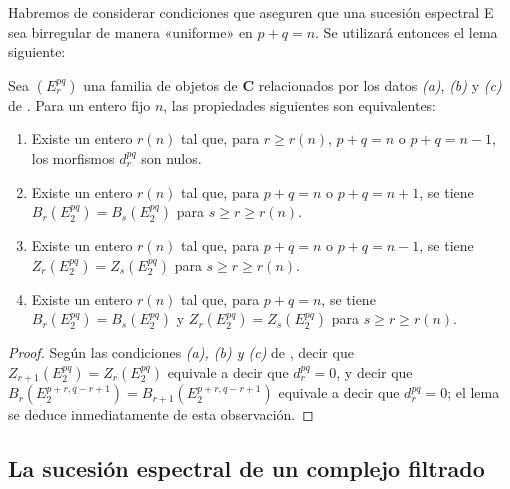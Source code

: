 \begin{env}[11.1.9]
\label{0.11.1.9-fr}
Habremos de considerar condiciones que aseguren que una sucesión espectral E sea birregular de manera «uniforme» en $p+q=n$.
Se utilizará entonces el lema siguiente:
\end{env}

\begin{lemma}[11.1.10]
\label{0.11.1.10}
\label{0.11.1.10-fr}
Sea $(E_r^{pq})$ una familia de objetos de $\mathbf{C}$ relacionados por los datos \emph{(a)}, \emph{(b)} y \emph{(c)} de .
Para un entero fijo $n$, las propiedades siguientes son equivalentes:
\begin{enumerate}
  \item[{\rm(a)}] Existe un entero $r(n)$ tal que, para $r\geq r(n)$, $p+q=n$ o $p+q=n-1$, los morfismos $d_r^{pq}$ son nulos.
  \item[{\rm(b)}] Existe un entero $r(n)$ tal que, para $p+q=n$ o $p+q=n+1$, se tiene $B_r(E_2^{pq})=B_s(E_2^{pq})$ para $s\geq r\geq r(n)$.
  \item[{\rm(c)}] Existe un entero $r(n)$ tal que, para $p+q=n$ o $p+q=n-1$, se tiene $Z_r(E_2^{pq})=Z_s(E_2^{pq})$ para $s\geq r\geq r(n)$.
  \item[{\rm(d)}] Existe un entero $r(n)$ tal que, para $p+q=n$, se tiene $B_r(E_2^{pq})=B_s(E_2^{pq})$ y $Z_r(E_2^{pq})=Z_s(E_2^{pq})$ para $s\geq r\geq r(n)$.
\end{enumerate}
\end{lemma}

\begin{proof}
Según las condiciones \emph{(a), (b) y (c)} de , decir que $Z_{r+1}(E_2^{pq})=Z_r(E_2^{pq})$ equivale a decir que $d_r^{pq}=0$, y decir que $B_r(E_2^{p+r,q-r+1})=B_{r+1}(E_2^{p+r,q-r+1})$ equivale a decir que $d_r^{pq}=0$; el lema se deduce inmediatamente de esta observación.
\end{proof}

\subsection{La sucesión espectral de un complejo filtrado}
\label{subsection:0.11.2}
\label{subsection:0.11.2-fr}

